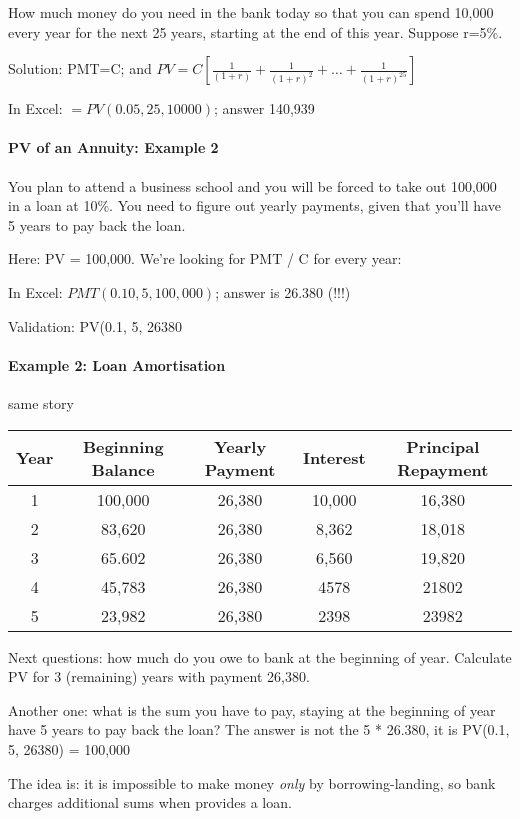 \documentclass{scrartcl}
\begin{document}
How much money do you need in the bank today so that you can spend 10,000 every
year for the next 25 years, starting at the end of this year. Suppose r=5\%.

Solution: PMT=C; and $PV = C [ \frac{1}{(1+r)} + \frac{1}{(1+r)^2} + \dots +
\frac{1}{(1+r)^{25}} ]$

In Excel: $=PV(0.05, 25, 10000)$; answer 140,939

\paragraph{PV of an Annuity: Example 2}
\label{sec:3-6-1}

You plan to attend a business school and you will be forced to take out 100,000
in a loan at 10\%. You need to figure out yearly payments, given that you'll
have 5 years to pay back the loan.

Here: PV = 100,000. We're looking for PMT / C for every year:

In Excel: $PMT(0.10, 5, 100,000)$; answer is 26.380 (!!!)

Validation: PV(0.1, 5, 26380

\paragraph{Example 2: Loan Amortisation} same story

\begin{tabular}{c|c|c|c|c}
  Year & Beginning Balance & Yearly Payment & Interest & Principal Repayment \\
  \hline
  1 & 100,000 & 26,380 & 10,000  & 16,380 \\
  2 & 83,620 & 26,380 & 8,362 & 18,018 \\
  3 & 65.602 & 26,380 & 6,560 & 19,820 \\
  4 & 45,783 & 26,380 & 4578 & 21802 \\
  5 & 23,982 & 26,380 & 2398 & 23982 
\end{tabular}

Next questions: how much do you owe to bank at the beginning of year. Calculate
PV for 3 (remaining) years with payment 26,380.

Another one: what is the sum you have to pay, staying at the beginning of year
have 5 years to pay back the loan? The answer is not the 5 * 26.380, it is
PV(0.1, 5, 26380) = 100,000

The idea is: it is impossible to make money {\it only} by borrowing-landing, so
bank charges additional sums when provides a loan.
\end{document}
